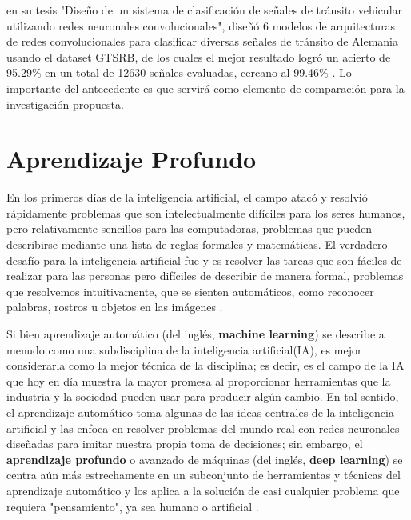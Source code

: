 		\citep{Ayuque2016} en su tesis "Diseño de un sistema de clasificación de señales de tránsito vehicular utilizando redes neuronales convolucionales", diseñó 6 modelos de arquitecturas de redes convolucionales para clasificar diversas señales de tránsito de Alemania usando el dataset GTSRB, de los cuales el mejor resultado logró un acierto de 95.29\% en un total de 12630 señales evaluadas, cercano al 99.46\% \citep{Ciresan}. Lo importante del antecedente es que servirá como elemento de comparación para la investigación propuesta. 
		


\section{Aprendizaje Profundo} 
	En los primeros días de la inteligencia artificial, el campo atacó y resolvió rápidamente problemas que son intelectualmente difíciles para los seres humanos, pero relativamente sencillos para las computadoras, problemas que pueden describirse mediante una lista de reglas formales y matemáticas. El verdadero desafío para la inteligencia artificial fue y es resolver las tareas que son fáciles de realizar para las personas pero difíciles de describir de manera formal, problemas que resolvemos intuitivamente, que se sienten automáticos, como reconocer palabras, rostros u objetos en las imágenes \citep{Goodfellow-et-al-2016}.

	
	Si bien aprendizaje automático (del inglés, {\bf machine learning}) se describe a menudo como una subdisciplina de la inteligencia artificial(IA), es mejor considerarla como la mejor técnica de la disciplina; es decir, es el campo de la IA que hoy en día muestra la mayor promesa al proporcionar herramientas que la industria y la sociedad pueden usar para producir algún cambio. En tal sentido, el aprendizaje automático toma algunas de las ideas centrales de la inteligencia artificial y las enfoca en resolver problemas del mundo real con redes neuronales diseñadas para imitar nuestra propia toma de decisiones; sin embargo, el {\bf aprendizaje profundo} o avanzado de máquinas (del inglés, {\bf deep learning}) se centra aún más estrechamente en un subconjunto de herramientas y técnicas del aprendizaje automático y los aplica a la solución de casi cualquier problema que requiera "pensamiento", ya sea humano o artificial \citep{Goodfellow-et-al-2016}.

